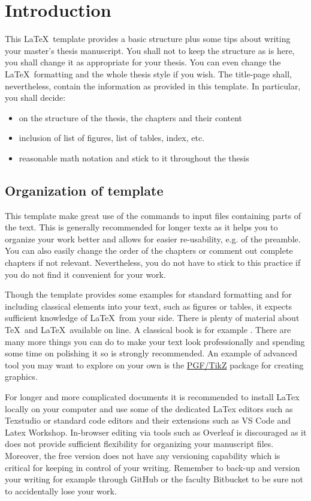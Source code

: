 
\chapter{Introduction}\label{ch:Intro}
This \LaTeX\ template provides a basic structure plus some tips about writing your master's thesis manuscript. 
You shall not to keep the structure as is here, you shall change it as appropriate for your thesis.
You can even change the \LaTeX\ formatting and the whole thesis style if you wish.
The title-page shall, nevertheless, contain the information as provided in this template.
In particular, you shall decide:
\begin{itemize}[noitemsep, nosep]
\item on the structure of the thesis, the chapters and their content
\item inclusion of list of figures, list of tables, index, etc.
\item reasonable math notation and stick to it throughout the thesis
\end{itemize}

\section{Organization of template}\label{sec:Intro_orga}
This template make great use of the \verb|| commands to input files containing parts of the text.
This is generally recommended for longer texts as it helps you to organize your work better and allows for easier re-usability, e.g. of the preamble.
You can also easily change the order of the chapters or comment out complete chapters if not relevant.
Nevertheless, you do not have to stick to this practice if you do not find it convenient for your work.

Though the template provides some examples for standard formatting and for including classical elements into your text, such as figures or tables, it expects sufficient knowledge of \LaTeX\ from your side.
There is plenty of material about \TeX\ and \LaTeX\ available on line.
A classical book is for example \cite{oetikerNotShortIntroduction2023}.
There are many more things you can do to make your text look professionally and spending some time on polishing it so is strongly recommended.
An example of advanced tool you may want to explore on your own is the \href{https://ctan.org/pkg/pgf?lang=en}{PGF/TikZ} package for creating graphics.

For longer and more complicated documents it is recommended to install LaTex locally on your computer and use some of the dedicated LaTex editors such as Texstudio or standard code editors and their extensions such as VS Code and Latex Workshop. 
In-browser editing via tools such as Overleaf is discouraged as it does not provide sufficient flexibility for organizing your manuscript files.
Moreover, the free version does not have any versioning capability which is critical for keeping in control of your writing.
Remember to back-up and version your writing for example through GitHub or the faculty Bitbucket to be sure not to accidentally lose your work.


